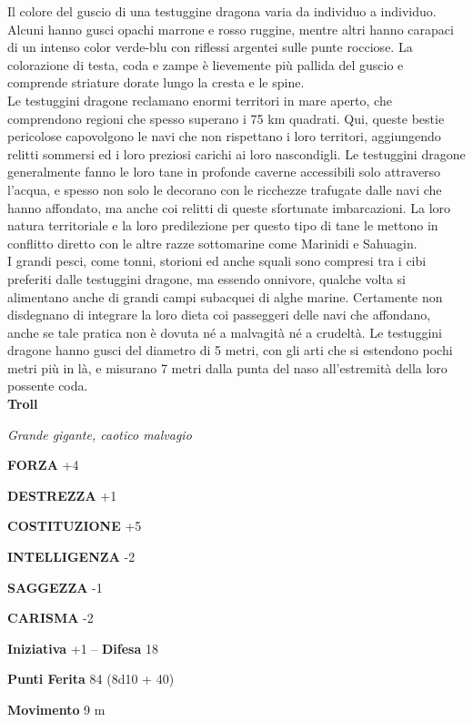 \begin{multicols}{2}
Il colore del guscio di una testuggine dragona varia da individuo a individuo. Alcuni hanno gusci opachi marrone e rosso ruggine, mentre altri hanno carapaci di un intenso color verde-blu con riflessi argentei sulle punte rocciose. La colorazione di testa, coda e zampe è lievemente più pallida del guscio e comprende striature dorate lungo la cresta e le spine.\\
Le testuggini dragone reclamano enormi territori in mare aperto, che comprendono regioni che spesso superano i 75 km quadrati. Qui, queste bestie pericolose capovolgono le navi che non rispettano i loro territori, aggiungendo relitti sommersi ed i loro preziosi carichi ai loro nascondigli. Le testuggini dragone generalmente fanno le loro tane in profonde caverne accessibili solo attraverso l'acqua, e spesso non solo le decorano con le ricchezze trafugate dalle navi che hanno affondato, ma anche coi relitti di queste sfortunate imbarcazioni. La loro natura territoriale e la loro predilezione per questo tipo di tane le mettono in conflitto diretto con le altre razze sottomarine come Marinidi e Sahuagin.\\

I grandi pesci, come tonni, storioni ed anche squali sono compresi tra i cibi preferiti dalle testuggini dragone, ma essendo onnivore, qualche volta si alimentano anche di grandi campi subacquei di alghe marine. Certamente non disdegnano di integrare la loro dieta coi passeggeri delle navi che affondano, anche se tale pratica non è dovuta né a malvagità né a crudeltà. Le testuggini dragone hanno gusci del diametro di 5 metri, con gli arti che si estendono pochi metri più in là, e misurano 7 metri dalla punta del naso all'estremità della loro possente coda.\\

\medskip{}\textbf{Troll}

\emph{Grande gigante, caotico malvagio}

\textbf{FORZA} +4

\textbf{DESTREZZA} +1

\textbf{COSTITUZIONE} +5

\textbf{INTELLIGENZA} -2

\textbf{SAGGEZZA} -1

\textbf{CARISMA} -2

\textbf{Iniziativa} +1 -- \textbf{Difesa} 18

\textbf{Punti Ferita} 84 (8d10 + 40)

\textbf{Movimento} 9 m


\end{multicols}
